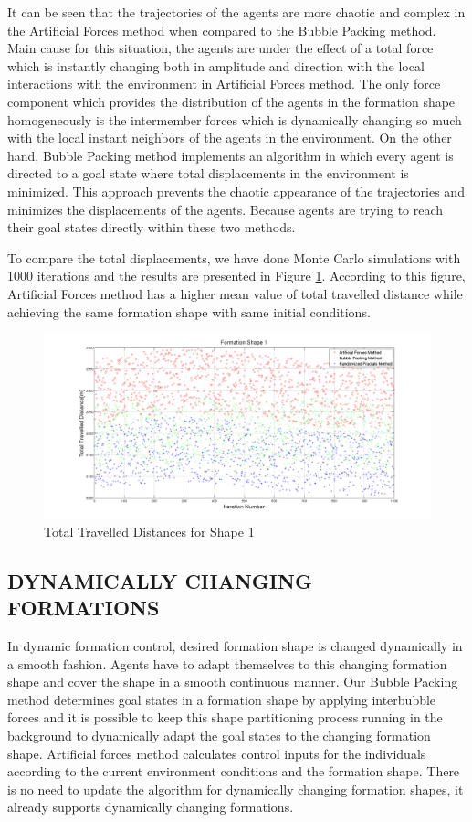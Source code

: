 \documentclass[letterpaper, 10 pt, conference]{ieeeconf}  %
\begin{document}
It can be seen that the trajectories of the agents are more chaotic and complex in the Artificial Forces method when compared to the Bubble Packing method. Main cause for this situation, the agents are under the effect of a total force which is instantly changing both in amplitude and direction with the local interactions with the environment in Artificial Forces method. The only force component which provides the distribution of the agents in the formation shape homogeneously is the intermember forces which is dynamically changing so much with the local instant neighbors of the agents in the environment. On the other hand, Bubble Packing method implements an algorithm in which every agent is directed to a goal state where total displacements in the environment is minimized. This approach prevents the chaotic appearance of the trajectories and minimizes the displacements of the agents. Because agents are trying to reach their goal states directly within these two methods. 

To compare the total displacements, we have done Monte Carlo simulations with 1000 iterations and the results are presented in Figure \ref{total_disp_1}. According to this figure, Artificial Forces method has a higher mean value of total travelled distance while achieving the same formation shape with same initial conditions.
		
\begin{figure}[thpb]
\caption{Total Travelled Distances for Shape 1} \label{total_disp_1}
\centerline{\includegraphics[scale = 0.18]{Total_Energy_Shape_1}}
\end{figure}

\subsection{DYNAMICALLY CHANGING FORMATIONS} \label{dynamical_ref}
In dynamic formation control, desired formation shape is changed dynamically in a smooth fashion. Agents have to adapt themselves to this changing formation shape and cover the shape in a smooth continuous manner.  Our Bubble Packing method determines goal states in a formation shape by applying interbubble forces and it is possible to keep this shape partitioning process running in the background to dynamically adapt the goal states to the changing formation shape. Artificial forces method calculates control inputs for the individuals according to the current environment conditions and the formation shape. There is no need to update the algorithm for dynamically changing formation shapes, it already supports dynamically changing formations.
\end{document}
